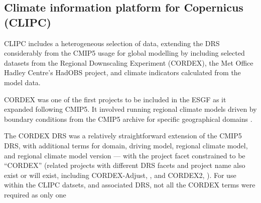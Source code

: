 \documentclass[final,1p,times,twocolumn,authoryear]{elsarticle}
\begin{document}
\subsection{Climate information platform for Copernicus (CLIPC)}

CLIPC \cite{} includes a heterogeneous selection of data, extending the DRS considerably from the CMIP5 usage for global modelling by including selected datasets from the Regional Downscaling Experiment (CORDEX), the Met Office Hadley Centre's HadOBS project, and climate indicators calculated from the model data.

CORDEX  was one of the first projects to be included in the ESGF as it expanded following CMIP5. It involved running regional climate models driven by boundary conditions from the CMIP5 archive for specific geographical domains \citep{Giorgi2009}. 

The CORDEX DRS \cite[described in][]{christensen2014cordex} was a relatively straightforward extension of the CMIP5 DRS, with additional terms for domain, driving model, regional climate model, and regional climate model version --- with the project facet constrained to be ``CORDEX'' (related projects with different DRS facets and project name also exist or will exist, including CORDEX-Adjust, \citealt{Nikulin2016}, and CORDEX2, \citealt{GutEA16}).
For use within the CLIPC datsets, and associated DRS, not all the CORDEX terms were required as only one 
\end{document}

